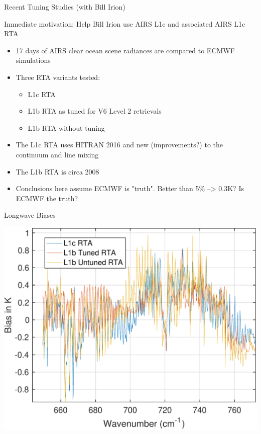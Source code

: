 \documentclass[10pt,t]{beamer}
\begin{document}





%

\begin{frame}[label={sec:org472f9d3}]{Recent Tuning Studies (with Bill Irion)}

Immediate motivation: Help Bill Irion use AIRS L1c and associated AIRS L1c RTA

\begin{itemize}
\item 17 days of AIRS clear ocean scene radiances are compared to ECMWF simulations
\item Three RTA variants tested:
\begin{itemize}
\item L1c RTA
\item L1b RTA as tuned for V6 Level 2 retrievals
\item L1b RTA without tuning
\end{itemize}
\item The L1c RTA uses HITRAN 2016 and new (improvements?) to the continuum and line mixing
\item The L1b RTA is circa 2008
\item Conclusions here assume ECMWF is "truth".  Better than 5\% --> 0.3K?  Is ECMWF the truth?
\end{itemize}
\end{frame}

\begin{frame}[label={sec:orgf207f3e}]{Longwave Biases}
\begin{center}
\includegraphics[width=0.75\linewidth]{./Talk2/bias_3rta_lw.pdf}
\end{center}
\end{frame}
\end{document}
